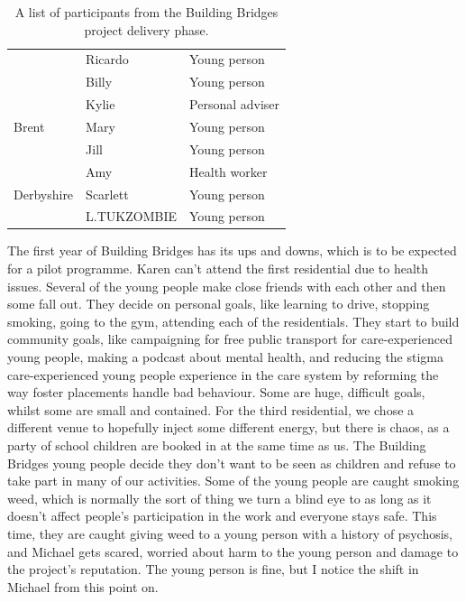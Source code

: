 \begin{table}[hbt!]
\begin{tabular}{|l|l|l|}
                               & Ricardo                   & Young person                  \\ \cline{2-3} 
                               & Billy                     & Young person                  \\ \hline
\multirow{3}{*}{Brent}         & Kylie                     & Personal adviser              \\ \cline{2-3} 
                               & Mary                      & Young person                  \\ \cline{2-3} 
                               & Jill                      & Young person                  \\ \hline
\multirow{3}{*}{Derbyshire}    & Amy                       & Health worker                 \\ \cline{2-3} 
                               & Scarlett                  & Young person                  \\ \cline{2-3} 
                               & L.TUKZOMBIE               & Young person                  \\ \hline
\end{tabular}
\caption{A list of participants from the Building Bridges project delivery phase.}
\label{tab:building-bridges-bridges}
\end{table}
The first year of Building Bridges has its ups and downs, which is to be expected for a pilot programme. Karen can't attend the first residential due to health issues. Several of the young people make close friends with each other and then some fall out. They decide on personal goals, like learning to drive, stopping smoking, going to the gym, attending each of the residentials. They start to build community goals, like campaigning for free public transport for care-experienced young people, making a podcast about mental health, and reducing the stigma care-experienced young people experience in the care system by reforming the way foster placements handle bad behaviour. Some are huge, difficult goals, whilst some are small and contained. For the third residential, we chose a different venue to hopefully inject some different energy, but there is chaos, as a party of school children are booked in at the same time as us.  The Building Bridges young people decide they don't want to be seen as children and refuse to take part in many of our activities. Some of the young people are caught smoking weed, which is normally the sort of thing we turn a blind eye to as long as it doesn't affect people's participation in the work and everyone stays safe. This time, they are caught giving weed to a young person with a history of psychosis, and Michael gets scared, worried about harm to the young person and damage to the project's reputation. The young person is fine, but I notice the shift in Michael from this point on.

